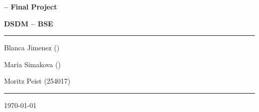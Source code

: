 \documentclass[12pt]{article}
\begin{document}
\begin{titlepage}
	\centering
	\par\vspace{0.75cm}
	{\huge\bfseries \cl -- Final Project \nass\par}
        {\large\bfseries DSDM -- BSE\par}
	\vspace{0.75cm}
    \noindent\rule{\textwidth}{1pt}
    {\Large Blanca Jimenez ()\par}
    {\Large Maria Simakova ()\par}
	{\Large Moritz Peist (254017)\par}
    \noindent\rule{\textwidth}{1pt}
    \tableofcontents
	\vfill

	{\large \today\par}
\end{titlepage}

\newpage




%

\printbibliography[heading=bibintoc,title={References}]
\end{document}
